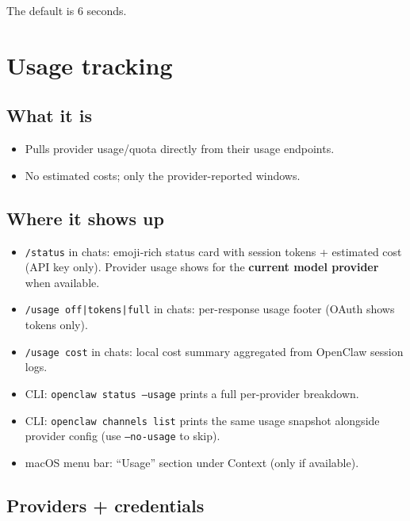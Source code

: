 The default is 6 seconds.


\clearpage

\section{Usage tracking}


\subsection{What it is}


\begin{itemize}
  \item Pulls provider usage/quota directly from their usage endpoints.
  \item No estimated costs; only the provider-reported windows.
\end{itemize}


\subsection{Where it shows up}


\begin{itemize}
  \item \texttt{/status} in chats: emoji‑rich status card with session tokens + estimated cost (API key only). Provider usage shows for the \textbf{current model provider} when available.
  \item \texttt{/usage off|tokens|full} in chats: per-response usage footer (OAuth shows tokens only).
  \item \texttt{/usage cost} in chats: local cost summary aggregated from OpenClaw session logs.
  \item CLI: \texttt{openclaw status --usage} prints a full per-provider breakdown.
  \item CLI: \texttt{openclaw channels list} prints the same usage snapshot alongside provider config (use \texttt{--no-usage} to skip).
  \item macOS menu bar: “Usage” section under Context (only if available).
\end{itemize}


\subsection{Providers + credentials}


